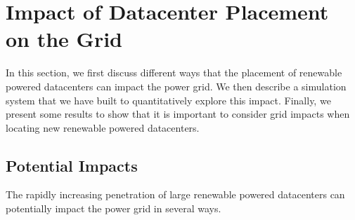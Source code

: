 \section{Impact of Datacenter Placement on the Grid}
\label{sec:quantify}

In this section, we first discuss different ways that the placement of renewable powered datacenters can impact the power grid.  We then describe a simulation system that we have built to quantitatively explore this impact.  Finally, we present some results to show that it is important to consider grid impacts when locating new renewable powered datacenters.


\subsection{Potential Impacts}

The rapidly increasing penetration of large renewable powered datacenters can potentially impact the power grid in several ways.

